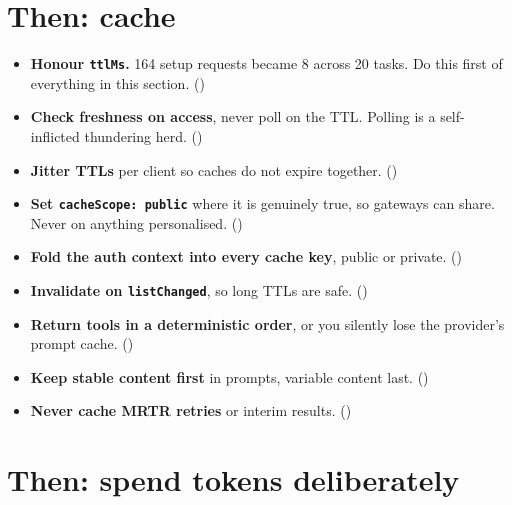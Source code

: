 \section{Then: cache}

\begin{itemize}[leftmargin=1.6em, itemsep=3pt]
\item[$\square$] \textbf{Honour \texttt{ttlMs}.} 164 setup requests became 8
across 20 tasks. Do this first of everything in this section.
()
\item[$\square$] \textbf{Check freshness on access}, never poll on the TTL.
Polling is a self-inflicted thundering herd. ()
\item[$\square$] \textbf{Jitter TTLs} per client so caches do not expire
together. ()
\item[$\square$] \textbf{Set \texttt{cacheScope: public}} where it is genuinely
true, so gateways can share. Never on anything personalised.
()
\item[$\square$] \textbf{Fold the auth context into every cache key}, public or
private. ()
\item[$\square$] \textbf{Invalidate on \texttt{listChanged}}, so long TTLs are
safe. ()
\item[$\square$] \textbf{Return tools in a deterministic order}, or you silently
lose the provider's prompt cache. ()
\item[$\square$] \textbf{Keep stable content first} in prompts, variable content
last. ()
\item[$\square$] \textbf{Never cache MRTR retries} or interim results.
()
\end{itemize}

\section{Then: spend tokens deliberately}

